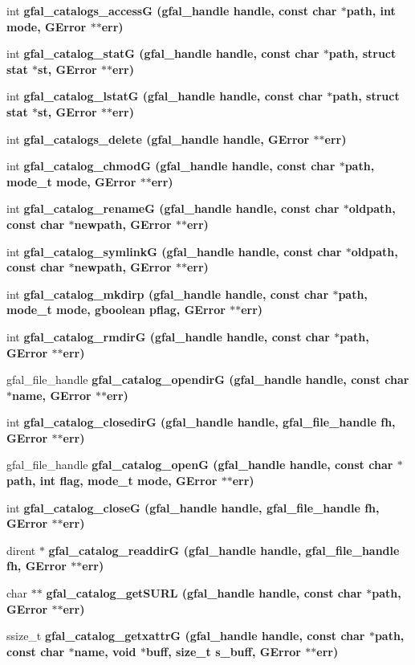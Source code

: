 \begin{CompactItemize}
\item 
int \bf{gfal\_\-catalogs\_\-access\-G} (gfal\_\-handle handle, const char $\ast$path, int mode, GError $\ast$$\ast$err)
\item 
int \bf{gfal\_\-catalog\_\-stat\-G} (gfal\_\-handle handle, const char $\ast$path, struct stat $\ast$st, GError $\ast$$\ast$err)
\item 
int \bf{gfal\_\-catalog\_\-lstat\-G} (gfal\_\-handle handle, const char $\ast$path, struct stat $\ast$st, GError $\ast$$\ast$err)
\item 
int \bf{gfal\_\-catalogs\_\-delete} (gfal\_\-handle handle, GError $\ast$$\ast$err)
\item 
int \bf{gfal\_\-catalog\_\-chmod\-G} (gfal\_\-handle handle, const char $\ast$path, mode\_\-t mode, GError $\ast$$\ast$err)
\item 
int \bf{gfal\_\-catalog\_\-rename\-G} (gfal\_\-handle handle, const char $\ast$oldpath, const char $\ast$newpath, GError $\ast$$\ast$err)
\item 
int \bf{gfal\_\-catalog\_\-symlink\-G} (gfal\_\-handle handle, const char $\ast$oldpath, const char $\ast$newpath, GError $\ast$$\ast$err)
\item 
int \bf{gfal\_\-catalog\_\-mkdirp} (gfal\_\-handle handle, const char $\ast$path, mode\_\-t mode, gboolean pflag, GError $\ast$$\ast$err)
\item 
int \bf{gfal\_\-catalog\_\-rmdir\-G} (gfal\_\-handle handle, const char $\ast$path, GError $\ast$$\ast$err)
\item 
gfal\_\-file\_\-handle \bf{gfal\_\-catalog\_\-opendir\-G} (gfal\_\-handle handle, const char $\ast$name, GError $\ast$$\ast$err)
\item 
int \bf{gfal\_\-catalog\_\-closedir\-G} (gfal\_\-handle handle, gfal\_\-file\_\-handle fh, GError $\ast$$\ast$err)
\item 
gfal\_\-file\_\-handle \bf{gfal\_\-catalog\_\-open\-G} (gfal\_\-handle handle, const char $\ast$path, int flag, mode\_\-t mode, GError $\ast$$\ast$err)
\item 
int \bf{gfal\_\-catalog\_\-close\-G} (gfal\_\-handle handle, gfal\_\-file\_\-handle fh, GError $\ast$$\ast$err)
\item 
dirent $\ast$ \bf{gfal\_\-catalog\_\-readdir\-G} (gfal\_\-handle handle, gfal\_\-file\_\-handle fh, GError $\ast$$\ast$err)
\item 
char $\ast$$\ast$ \bf{gfal\_\-catalog\_\-get\-SURL} (gfal\_\-handle handle, const char $\ast$path, GError $\ast$$\ast$err)
\item 
ssize\_\-t \bf{gfal\_\-catalog\_\-getxattr\-G} (gfal\_\-handle handle, const char $\ast$path, const char $\ast$name, void $\ast$buff, size\_\-t s\_\-buff, GError $\ast$$\ast$err)\label{gfal__common__catalog_8c_27b4d14215f7f57a06066ec682569bf3}


\end{CompactItemize}
